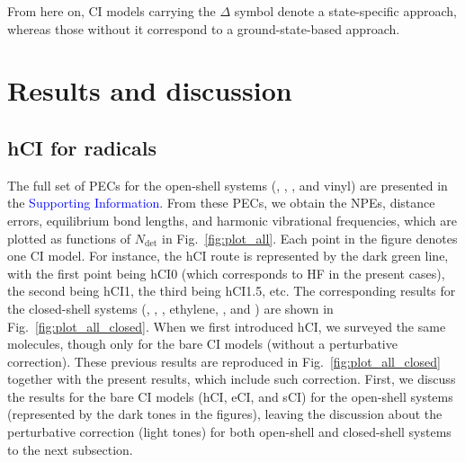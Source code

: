 \documentclass[aip,jcp,reprint,noshowkeys,superscriptaddress]{revtex4-1}
\newcommand{\SupInf}{\textcolor{blue}{Supporting Information}}
\newcommand{\Ndet}{N_\text{det}}
\begin{document}
From here on, CI models carrying the $\Delta$ symbol denote a state-specific approach, whereas those without it correspond to a ground-state-based approach.

\section{Results and discussion}
\label{sec:res}

\subsection{hCI for radicals}
\label{sec:res_A}

The full set of PECs for the open-shell systems (, , , and vinyl) are presented in the {\SupInf}.
From these PECs, we obtain the NPEs, distance errors, equilibrium bond lengths, and harmonic vibrational frequencies, which are plotted as functions of $\Ndet$ in Fig.~\ref{fig:plot_all}.
Each point in the figure denotes one CI model.
For instance, the hCI route is represented by the dark green line, with the first point being hCI0 (which corresponds to HF in the present cases), the second being hCI1, the third being hCI1.5, etc.
The corresponding results for the closed-shell systems (, , , ethylene, , and ) are shown in Fig.~\ref{fig:plot_all_closed}.
When we first introduced hCI, \cite{Kossoski_2022} we surveyed the same molecules, though only for the bare CI models (without a perturbative correction).
These previous results are reproduced in Fig.~\ref{fig:plot_all_closed} together with the present results, which include such correction.
First, we discuss the results for the bare CI models (hCI, eCI, and sCI) for the open-shell systems (represented by the dark tones in the figures),
leaving the discussion about the perturbative correction (light tones) for both open-shell and closed-shell systems to the next subsection.
\end{document}
